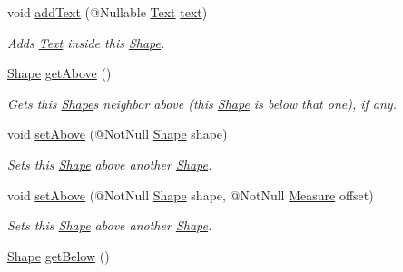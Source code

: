 \begin{DoxyCompactItemize}
void \hyperlink{classcom_1_1aarrelaakso_1_1drawl_1_1_shape_a9784264f6abcf623b2774d6ef2a53fdc}{add\+Text} (@Nullable \hyperlink{classcom_1_1aarrelaakso_1_1drawl_1_1_text}{Text} \hyperlink{classcom_1_1aarrelaakso_1_1drawl_1_1_shape_ab54afc2d95d3447532f5ecf3fec3faa8}{text})
\begin{DoxyCompactList}\small\item\em Adds \hyperlink{classcom_1_1aarrelaakso_1_1drawl_1_1_text}{Text} inside this \hyperlink{classcom_1_1aarrelaakso_1_1drawl_1_1_shape}{Shape}. \end{DoxyCompactList}\item 
\hyperlink{classcom_1_1aarrelaakso_1_1drawl_1_1_shape}{Shape} \hyperlink{classcom_1_1aarrelaakso_1_1drawl_1_1_shape_acebea2aa57031322323c9bf50ee447db}{get\+Above} ()
\begin{DoxyCompactList}\small\item\em Gets this \hyperlink{classcom_1_1aarrelaakso_1_1drawl_1_1_shape}{Shape}\textquotesingle{}s neighbor above (this \hyperlink{classcom_1_1aarrelaakso_1_1drawl_1_1_shape}{Shape} is below that one), if any. \end{DoxyCompactList}\item 
void \hyperlink{classcom_1_1aarrelaakso_1_1drawl_1_1_shape_a47d2d3ec9719ad5ccc1d1dfb791358d4}{set\+Above} (@Not\+Null \hyperlink{classcom_1_1aarrelaakso_1_1drawl_1_1_shape}{Shape} shape)
\begin{DoxyCompactList}\small\item\em Sets this \hyperlink{classcom_1_1aarrelaakso_1_1drawl_1_1_shape}{Shape} above another \hyperlink{classcom_1_1aarrelaakso_1_1drawl_1_1_shape}{Shape}. \end{DoxyCompactList}\item 
void \hyperlink{classcom_1_1aarrelaakso_1_1drawl_1_1_shape_a3d3e7adc0ba7f4634c913773d326f4e6}{set\+Above} (@Not\+Null \hyperlink{classcom_1_1aarrelaakso_1_1drawl_1_1_shape}{Shape} shape, @Not\+Null \hyperlink{classcom_1_1aarrelaakso_1_1drawl_1_1_measure}{Measure} offset)
\begin{DoxyCompactList}\small\item\em Sets this \hyperlink{classcom_1_1aarrelaakso_1_1drawl_1_1_shape}{Shape} above another \hyperlink{classcom_1_1aarrelaakso_1_1drawl_1_1_shape}{Shape}. \end{DoxyCompactList}\item 
\hyperlink{classcom_1_1aarrelaakso_1_1drawl_1_1_shape}{Shape} \hyperlink{classcom_1_1aarrelaakso_1_1drawl_1_1_shape_a53de5ab609d879719cd3b372dfe8df58}{get\+Below} ()

\end{DoxyCompactItemize}
